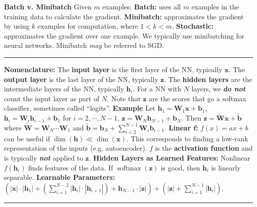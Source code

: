 \documentclass{article}
\newcommand{\x}{\bf{x}}
\newcommand{\z}{\bf{z}}
\newcommand{\h}{\bf{h}}
\renewcommand{\b}{\bf{b}}
\newcommand{\W}{\bf{W}}
\renewcommand{\bf}[1]{\textbf{{#1}}}
\renewcommand{\it}[1]{\textit{{#1}}}
\newcommand{\ib}[1]{\textit{\textbf{{#1}}}}
\DeclareMathOperator*{\sm}{softmax}
\begin{document}
\begin{small}
\bf{Batch v. Minibatch}
Given $m$ examples:
\newline
\bf{Batch:} uses all $m$ examples in the training data to calculate the gradient.
\bf{Minibatch:} approximates the gradient by using $k$ examples for computation, where $1 < k < m$.
\bf{Stochastic:} approximates the gradient over one example.
We typically use minibatching for neural networks. Minibatch \it{may} be referred to SGD.
\hrule
\vspace{0.1em}
\bf{Nomenclature:} The \bf{input layer} is the first layer of the NN, typically $\x$.
The \bf{output layer} is the last layer of the NN, typically $\z$. The \bf{hidden layers} are the
intermediate layers of the NN, typically $\h_i$. For a NN with $N$ layers, we \ib{do not} count the
input layer as part of $N$. Note that $\z$ are the scores that go a softmax classifier, sometimes
called ``logits''.
\newline
\bf{Example}
\newline
Let $\h_1 = \W_1 \x + \b_1$, $\h_i = \W_i \h_{i - 1} + \b_1$ for $i = 2, \cdots, N - 1$, 
$\z = \W_N \h_{N - 1} + \b_N$. Then $\z = \widetilde{\W} \x + \widetilde{\b}$ where 
$\widetilde{\W} = \W_N \cdots \W_1$ and 
$\widetilde{\b} = \b_N + \sum_{i = 2}^{N - 1} \W_i \b_{i - 1}$.
\newline
\bf{Linear $\bm{f}$:} $f(x) = ax + b$ can be useful if $\dim(\h) \ll \dim(\x)$. This corresponds to
finding a low-rank representation of the inputs (e.g. autoencoder).
\newline
$f$ is the \bf{activation function} and is typically \ib{not} applied to $\z$.
\newline
\bf{Hidden Layers as Learned Features:} Nonlinear $f(\h_i)$ finds features of the data. If $\sm(\z)$
is good, then $\h_i$ is linearly separable.
\newline
\bf{Learnable Parameters:} 
$
\left(
    |\x| \cdot |\h_1| 
    + 
    \left( \sum_{i = 1}^{N - 2} |\h_i| \cdot |\h_{i + 1}| \right) 
    + 
    \h_{N - 1} \cdot |\z|
\right)
+
\left(
    |\z| + \sum_{i = 1}^{N - 1} |\h_i|
\right)
$.
\vspace{0.1em}

\hrule
\vspace{0.1em}


\end{small}
\end{document}
